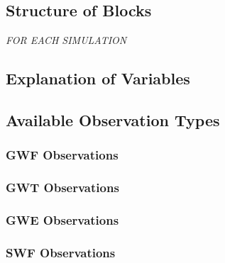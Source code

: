 

\subsection{Structure of Blocks}
\vspace{5mm}

\noindent \textit{FOR EACH SIMULATION}



\subsection{Explanation of Variables}
\begin{description}

\end{description}


\subsection{Available Observation Types}

\subsubsection{GWF Observations}


\subsubsection{GWT Observations}


\subsubsection{GWE Observations}


\subsubsection{SWF Observations}

